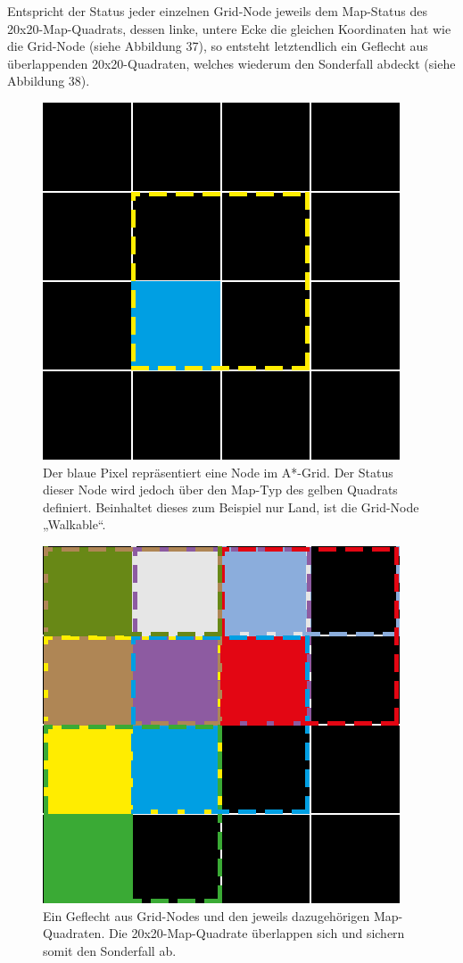 \documentclass[a4paper,12pt]{article}
\begin{document}
Entspricht der Status jeder einzelnen Grid-Node jeweils dem Map-Status des 20x20-Map-Quadrats, dessen linke, untere Ecke die gleichen Koordinaten hat wie die Grid-Node (siehe Abbildung 37), so entsteht letztendlich ein Geflecht aus überlappenden 20x20-Quadraten, welches wiederum den Sonderfall abdeckt (siehe Abbildung 38).

\begin{figure}[H]
\centering
    \includegraphics[width=.8\linewidth]{Bilder/Aufgabe3/Teilaufgabe_A/AStar_Grid.png}
    \caption{Der blaue Pixel repräsentiert eine Node im A*-Grid. Der Status dieser Node wird jedoch über den Map-Typ des gelben Quadrats definiert. Beinhaltet dieses zum Beispiel nur Land, ist die Grid-Node „Walkable“.}
\end{figure}

\begin{figure}[H]
\centering
    \includegraphics[width=.8\linewidth]{Bilder/Aufgabe3/Teilaufgabe_A/AStar_Grid_02.png}
    \caption{Ein Geflecht aus Grid-Nodes und den jeweils dazugehörigen Map-Quadraten. Die 20x20-Map-Quadrate überlappen sich und sichern somit den Sonderfall ab.}
\end{figure}
\end{document}
